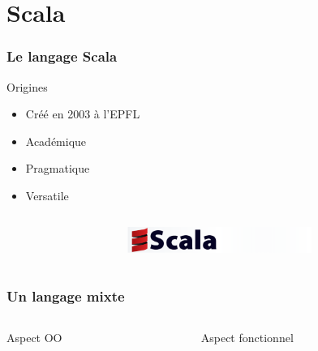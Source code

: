 \documentclass{beamer}
\begin{document}
\section{Scala}

\begin{frame}

  \frametitle{Le langage Scala}

  \begin{block}{Origines}
    \begin{itemize}
    \item{Créé en 2003 à l'EPFL}
    \item{Académique}
    \item{Pragmatique}
    \item{Versatile}
    \end{itemize}
  \end{block}

  \vfill

  \begin{columns}

    \begin{column}{0.5\textwidth}
    \end{column}
    
    \begin{column}{0.5\textwidth}
      \begin{figure}
        \centering
        \includegraphics[width=6cm]{scala.png}
      \end{figure}
    \end{column}

  \end{columns}
  
\end{frame}

\begin{frame}
  
  \frametitle{Un langage mixte}

  \begin{columns}

    \begin{column}{0.5\textwidth}
      \begin{block}{Aspect OO}

      \end{block}
    \end{column}
    
    \begin{column}{0.5\textwidth}
      \begin{block}{Aspect fonctionnel}

      \end{block}
    \end{column}

  \end{columns}
  
\end{frame}

\begin{frame}

  

\end{frame}



\end{document}
